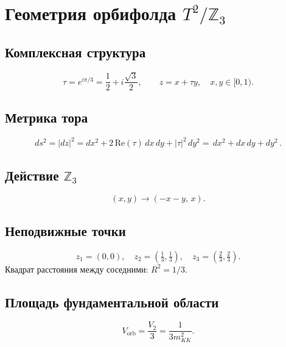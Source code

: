\documentclass[12pt,a4paper]{article}
\numberwithin{equation}{section}
\begin{document}
\section{Геометрия орбифолда $T^2/\mathbb{Z}_3$}

\subsection{Комплексная структура}
\begin{equation}
\tau = e^{i\pi/3} = \frac{1}{2} + i\frac{\sqrt3}{2}, \qquad 
z = x + \tau y, \quad x,y\in[0,1).
\end{equation}

\subsection{Метрика тора}
\begin{equation}
ds^2 = |dz|^2 = dx^2 + 2\,\mathrm{Re}(\tau)\,dx\,dy + |\tau|^2\,dy^2 
= \boxed{\,dx^2 + dx\,dy + dy^2\,}.
\end{equation}

\subsection{Действие $\mathbb{Z}_3$}
\begin{equation}
(x,y) \to (-x-y,\, x).
\end{equation}

\subsection{Неподвижные точки}
\begin{equation}
\boxed{\;z_1 = (0,0), \quad z_2 = \left(\tfrac13,\tfrac13\right), 
\quad z_3 = \left(\tfrac23,\tfrac23\right).\;}
\end{equation}
Квадрат расстояния между соседними: $R^2 = 1/3$.

\subsection{Площадь фундаментальной области}
\begin{equation}
V_{\text{orb}} = \frac{V_2}{3} = \frac{1}{3m_{KK}^2}.
\end{equation}

\end{document}
